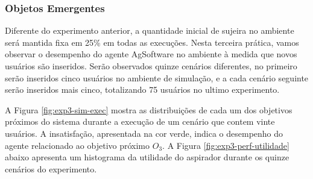 \subsubsection{Objetos Emergentes}

Diferente do experimento anterior, a quantidade inicial de sujeira no ambiente será mantida fixa em 25\% em todas as execuções. Nesta terceira prática, vamos observar o desempenho do agente AgSoftware no ambiente à medida que novos usuários são inseridos. Serão observados quinze cenários diferentes, no primeiro serão inseridos cinco usuários no ambiente de simulação, e a  cada cenário seguinte serão inseridos mais cinco, totalizando 75 usuários no ultimo experimento.

\begin{figure}[h!]
    \centering
\end{figure}

A Figura \ref{fig:exp3-sim-exec} mostra as distribuições de cada um dos objetivos próximos do sistema durante a execução de um cenário que contem vinte usuários. A insatisfação, apresentada na cor verde, indica o desempenho do agente relacionado ao objetivo próximo $O_3$.  A Figura \ref{fig:exp3-perf-utilidade} abaixo apresenta um histograma da utilidade do aspirador durante os quinze cenários do experimento. 

\begin{figure}[h!]
    \centering
\end{figure}

